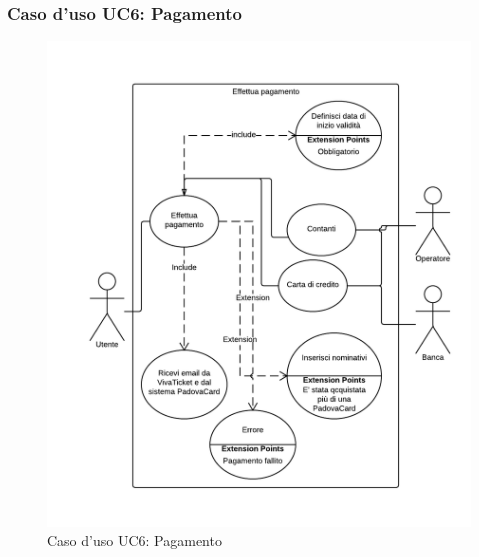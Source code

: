 \subsubsection{Caso d'uso UC6: Pagamento}\label{UC6}
\begin{figure}[H]
\centering
\includegraphics[width=1\textwidth]{images/UC6.png}
\caption{Caso d'uso UC6: Pagamento}
\end{figure}
